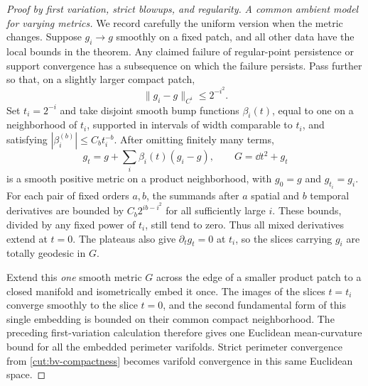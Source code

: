 \begin{proof}[Proof by first variation, strict blowups, and regularity]
\emph{A common ambient model for varying metrics.}
We record carefully the uniform version when the metric changes.
Suppose $g_i\to g$ smoothly on a fixed patch, and all other data have
the local bounds in the theorem.  Any claimed failure of regular-point
persistence or support convergence has a subsequence on which the
failure persists.  Pass further so that, on a slightly larger compact
patch,
\[
                  \|g_i-g\|_{C^i}\le 2^{-i^2}.
\]
Set $t_i=2^{-i}$ and take disjoint smooth bump functions $\beta_i(t)$,
equal to one on a neighborhood of $t_i$, supported in intervals of
width comparable to $t_i$, and satisfying
$|\beta_i^{(b)}|\le C_b t_i^{-b}$.  After omitting finitely many terms,
\[
 g_t=g+\sum_i\beta_i(t)(g_i-g),\qquad G=\dd t^2+g_t
\]
is a smooth positive metric on a product neighborhood, with $g_0=g$
and $g_{t_i}=g_i$.  For each pair of fixed orders $a,b$, the summands
after $a$ spatial and $b$ temporal derivatives are bounded by
$C_b2^{ib-i^2}$ for all sufficiently large $i$.  These bounds, divided
by any fixed power of $t_i$, still tend to zero.  Thus all mixed
derivatives extend at $t=0$.  The plateaus also give
$\partial_tg_t=0$ at $t_i$, so the slices carrying $g_i$ are totally
geodesic in $G$.

Extend this \emph{one} smooth metric $G$ across the edge of a smaller
product patch to a closed manifold and isometrically embed it once.
The images of the slices $t=t_i$ converge smoothly to the slice
$t=0$, and the second fundamental form of this single embedding is
bounded on their common compact neighborhood.  The preceding
first-variation calculation therefore gives one Euclidean
mean-curvature bound for all the embedded perimeter varifolds.
Strict perimeter convergence from \cref{cut:bv-compactness} becomes
varifold convergence in this same Euclidean space.


\end{proof}

